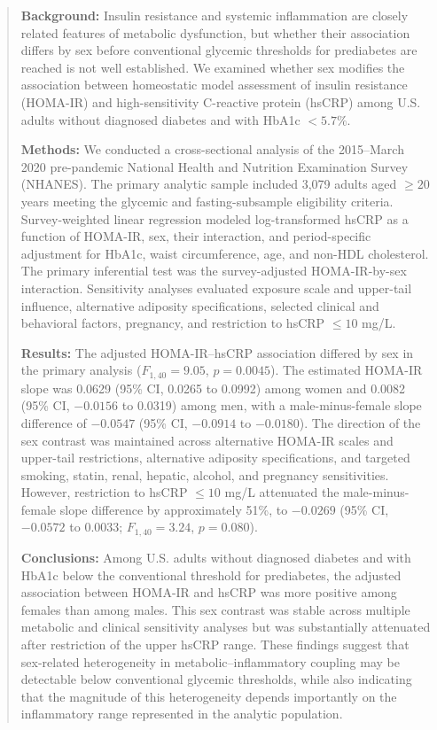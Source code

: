 \documentclass[11pt]{article}
\begin{document}
\begin{abstract}

\textbf{Background:}
Insulin resistance and systemic inflammation are closely related features of
metabolic dysfunction, but whether their association differs by sex before
conventional glycemic thresholds for prediabetes are reached is not well
established. We examined whether sex modifies the association between
homeostatic model assessment of insulin resistance (HOMA-IR) and
high-sensitivity C-reactive protein (hsCRP) among U.S. adults without
diagnosed diabetes and with HbA1c $<5.7\%$.

\textbf{Methods:}
We conducted a cross-sectional analysis of the 2015--March 2020
pre-pandemic National Health and Nutrition Examination Survey (NHANES).
The primary analytic sample included 3,079 adults aged $\geq20$ years
meeting the glycemic and fasting-subsample eligibility criteria.
Survey-weighted linear regression modeled log-transformed hsCRP as a
function of HOMA-IR, sex, their interaction, and period-specific adjustment
for HbA1c, waist circumference, age, and non-HDL cholesterol. The primary
inferential test was the survey-adjusted HOMA-IR-by-sex interaction.
Sensitivity analyses evaluated exposure scale and upper-tail influence,
alternative adiposity specifications, selected clinical and behavioral
factors, pregnancy, and restriction to hsCRP $\leq10$ mg/L.

\textbf{Results:}
The adjusted HOMA-IR--hsCRP association differed by sex in the primary
analysis ($F_{1,40}=9.05$, $p=0.0045$). The estimated HOMA-IR slope was
0.0629 (95\% CI, 0.0265 to 0.0992) among women and 0.0082
(95\% CI, $-0.0156$ to 0.0319) among men, with a male-minus-female slope
difference of $-0.0547$ (95\% CI, $-0.0914$ to $-0.0180$).
The direction of the sex contrast was maintained across alternative HOMA-IR
scales and upper-tail restrictions, alternative adiposity specifications,
and targeted smoking, statin, renal, hepatic, alcohol, and pregnancy
sensitivities. However, restriction to hsCRP $\leq10$ mg/L attenuated the
male-minus-female slope difference by approximately 51\%, to $-0.0269$
(95\% CI, $-0.0572$ to 0.0033; $F_{1,40}=3.24$, $p=0.080$).

\textbf{Conclusions:}
Among U.S. adults without diagnosed diabetes and with HbA1c below the
conventional threshold for prediabetes, the adjusted association between
HOMA-IR and hsCRP was more positive among females than among males. This sex contrast
was stable across multiple metabolic and clinical sensitivity analyses but
was substantially attenuated after restriction of the upper hsCRP range.
These findings suggest that sex-related heterogeneity in
metabolic--inflammatory coupling may be detectable below conventional
glycemic thresholds, while also indicating that the magnitude of this
heterogeneity depends importantly on the inflammatory range represented in
the analytic population.

\end{abstract}
\end{document}
